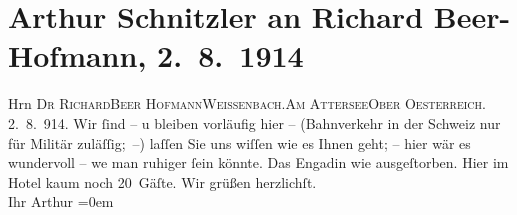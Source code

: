 

         
         \renewcommand{\erwaehntePersonen}{Personen: Richard Beer-Hofmann}
         \renewcommand{\erwaehnteOrte}{Orte: Attersee, Celerina, Cresta Palace, Engadin, Oberösterreich, Schweiz, Weißenbach am Attersee}
         \renewcommand{\erwaehnteWerke}{}
               \section[Arthur Schnitzler an Richard Beer-Hofmann, 2. 8. 1914]{ Arthur Schnitzler an Richard Beer-Hofmann, 2. 8. 1914}\nopagebreak{}\rehead{ }\begin{ledgroupsized}[t]{13cm}\normalsize\beginnumbering \toendnotes[C]{\smallbreak\pagebreak[2]} 
\toendnotes[C]{\smallbreak}\pstart{}{\pb}Hrn \textsc{Dr Richard}\pend{}\pstart{}\textsc{Beer Hofmann}\pend{}\pstart{}\textsc{Weissenbach.}\pend{}\pstart{}\textsc{Am Attersee}\pend{}\pstart{}\textsc{Ober Oesterreich}.\pend{}{\bigskip}\pstart
           \noindent{}\centering{}{\pb}\textcolor{gray}{\textbf{\label{T_L02189-1v}\label{T_L02189-1h}}}\pend
           \pstart
           {\pb}2. 8. 914. Wir ſind – u bleiben vorläufig hier –
               (Bahnverkehr in der Schweiz nur für Militär
               zuläſſig; –) laſſen Sie uns wiſſen wie es Ihnen geht; – hier wär es wundervoll – we{\geminationn} man ruhiger {\pb}ſein
               könnte. Das Engadin wie ausgeſtorben. Hier im
                  Hotel kaum noch 20 Gäſte.\pend
           \pstart
           Wir grüßen herzlichſt.{\\[\baselineskip]}Ihr \spacefill\mbox{Arthur}\pend
           \leftskip=0em{}
         
         \endnumbering{}\end{ledgroupsized}  \newcommand{\dateiname}{L02189}\newcommand{\titel}{Arthur Schnitzler an Richard Beer-Hofmann, 2. 8. 1914}\newcommand{\editorInnen}{Martin Anton Müller und Gerd-Hermann Susen}
      